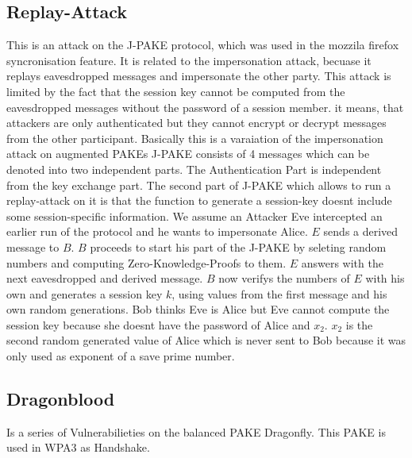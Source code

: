 \documentclass[journal]{IEEEtran}
\begin{document}
\subsection{Replay-Attack}
This is an attack on the J-PAKE protocol, which was used in the mozzila firefox syncronisation feature. It is related to the impersonation attack, becuase it replays eavesdropped messages and impersonate the other party.
This attack is limited by the fact that the session key cannot be computed from the eavesdropped messages without the password of a session member.
it means, that attackers are only authenticated but they cannot encrypt or decrypt messages from the other participant.
Basically this is a varaiation of the impersonation attack on augmented PAKEs 
J-PAKE consists of 4 messages which can be denoted into two independent parts. The Authentication Part is independent from the key exchange part.
The second part of J-PAKE which allows to run a replay-attack on it is that the function to generate a session-key doesnt include some session-specific information.
We assume an Attacker Eve intercepted an earlier run of the protocol and he wants to impersonate Alice.
$E$ sends a derived message to $B$. 
$B$ proceeds to start his part of the J-PAKE by seleting random numbers and computing Zero-Knowledge-Proofs to them.
$E$ answers with the next eavesdropped and derived message. 
$B$ now verifys the numbers of $E$ with his own and generates a session key $k$, using values from the first message and his own random generations.
Bob thinks Eve is Alice but Eve cannot compute the session key because she doesnt have the password of Alice and $x_2$.
$x_2$ is the second random generated value of Alice which is never sent to Bob because it was only used as exponent of a save prime number.  
\subsection{Dragonblood}
Is a series of Vulnerabilieties on the balanced PAKE Dragonfly. This PAKE is used in WPA3 as Handshake. 
\end{document}
